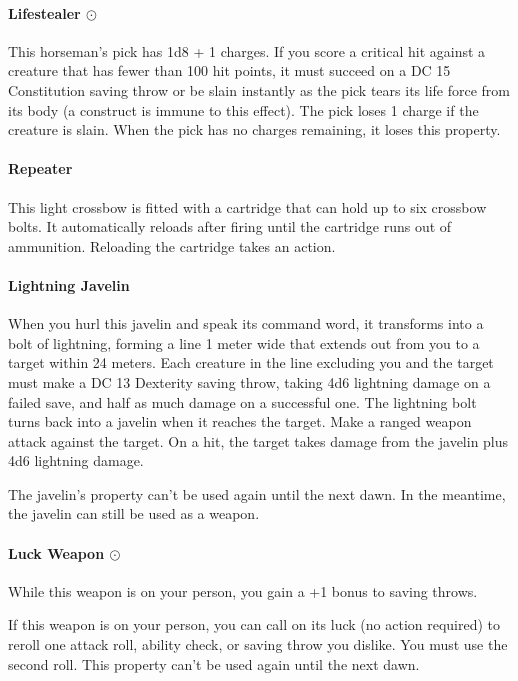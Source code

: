     \paragraph{Lifestealer $\odot$}
        This horseman's pick has 1d8 + 1 charges.
        If you score a critical hit against a creature that has fewer than 100 hit points, it must succeed on a DC 15 Constitution saving throw or be slain instantly as the pick tears its life force from its body (a construct is immune to this effect).
        The pick loses 1 charge if the creature is slain.
        When the pick has no charges remaining, it loses this property.
    \paragraph{Repeater}
        This light crossbow is fitted with a cartridge that can hold up to six crossbow bolts.
        It automatically reloads after firing until the cartridge runs out of ammunition.
        Reloading the cartridge takes an action.
    \paragraph{Lightning Javelin}
        When you hurl this javelin and speak its command word, it transforms into a bolt of lightning, forming a line 1 meter wide that extends out from you to a target within 24 meters.
        Each creature in the line excluding you and the target must make a DC 13 Dexterity saving throw, taking 4d6 lightning damage on a failed save, and half as much damage on a successful one.
        The lightning bolt turns back into a javelin when it reaches the target.
        Make a ranged weapon attack against the target.
        On a hit, the target takes damage from the javelin plus 4d6 lightning damage.

        The javelin's property can't be used again until the next dawn.
        In the meantime, the javelin can still be used as a weapon.
    \paragraph{Luck Weapon $\odot$}
        While this weapon is on your person, you gain a +1 bonus to saving throws.

        If this weapon is on your person, you can call on its luck (no action required) to reroll one attack roll, ability check, or saving throw you dislike.
        You must use the second roll.
        This property can't be used again until the next dawn.
